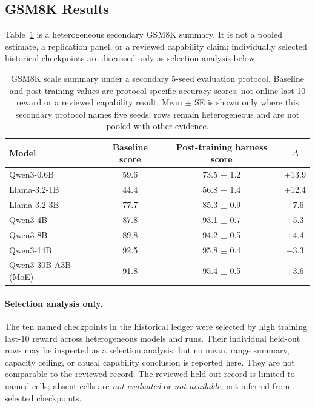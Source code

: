 \subsection{GSM8K Results}
\label{sec:gsm8k_results}

	Table~\ref{tab:results_gsm8k} is a heterogeneous secondary GSM8K summary.
	It is not a pooled estimate, a replication panel, or a reviewed capability
	claim; individually selected historical checkpoints are discussed only as
	selection analysis below.

\begin{table}[htbp]
\centering
\caption{GSM8K scale summary under a secondary 5-seed evaluation protocol. Baseline and post-training values are protocol-specific accuracy scores, not online last-10 reward or a reviewed capability result. Mean $\pm$ SE is shown only where this secondary protocol names five seeds; rows remain heterogeneous and are not pooled with other evidence.}
\label{tab:results_gsm8k}
\begin{tabular}{lccc}
\toprule
\textbf{Model} & \textbf{Baseline score} & \textbf{Post-training harness score} & \textbf{$\Delta$} \\
\midrule
Qwen3-0.6B & 59.6 & 73.5 $\pm$ 1.2 & +13.9 \\
Llama-3.2-1B & 44.4 & 56.8 $\pm$ 1.4 & +12.4 \\
Llama-3.2-3B & 77.7 & 85.3 $\pm$ 0.9 & +7.6 \\
Qwen3-4B & 87.8 & 93.1 $\pm$ 0.7 & +5.3 \\
Qwen3-8B & 89.8 & 94.2 $\pm$ 0.5 & +4.4 \\
Qwen3-14B & 92.5 & 95.8 $\pm$ 0.4 & +3.3 \\
Qwen3-30B-A3B (MoE) & 91.8 & 95.4 $\pm$ 0.5 & +3.6 \\
\bottomrule
\end{tabular}
\end{table}

	\paragraph{Selection analysis only.}
	The ten named checkpoints in the historical ledger were selected by high
	training last-10 reward across heterogeneous models and runs. Their individual
	held-out rows may be inspected as a selection analysis, but no mean, range
	summary, capacity ceiling, or causal capability conclusion is reported here.
	They are not comparable to the reviewed record. The reviewed held-out record is
	limited to named cells; absent cells are \emph{not evaluated} or \emph{not
	available}, not inferred from selected checkpoints.

